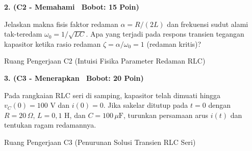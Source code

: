 \documentclass[10pt,a4paper]{article}
\begin{document}
\vspace{1mm}

\noindent\textbf{2. (C2 - Memahami \textbar\ Bobot: 15 Poin)}\par\vspace{0.5mm}
{\footnotesize Jelaskan makna fisis faktor redaman $\alpha = R/(2L)$ dan frekuensi sudut alami tak-teredam $\omega_0 = 1/\sqrt{LC}$. Apa yang terjadi pada respons transien tegangan kapasitor ketika rasio redaman $\zeta = \alpha/\omega_0 = 1$ (redaman kritis)?}
\begin{answerbox}{Ruang Pengerjaan C2 (Intuisi Fisika Parameter Redaman RLC)}
  \vspace{2.1cm}
\end{answerbox}

\vspace{1mm}

\noindent\textbf{3. (C3 - Menerapkan \textbar\ Bobot: 20 Poin)}\par\vspace{0.5mm}
\noindent\begin{minipage}[t]{0.60\textwidth}%
  {\footnotesize Pada rangkaian RLC seri di samping, kapasitor telah dimuati hingga $v_C(0) = 100\text{ V}$ dan $i(0) = 0$. Jika sakelar ditutup pada $t=0$ dengan $R = 20\,\Omega$, $L = 0{,}1\text{ H}$, dan $C = 100\,\mu\text{F}$, turunkan persamaan arus $i(t)$ dan tentukan ragam redamannya.}%
\end{minipage}%
\hfill%
\begin{minipage}[t]{0.37\textwidth}%
  \centering
\end{minipage}\par\vspace{1mm}
\begin{answerbox}{Ruang Pengerjaan C3 (Penurunan Solusi Transien RLC Seri)}
  \vspace{2.8cm}
\end{answerbox}

\newpage
\end{document}
